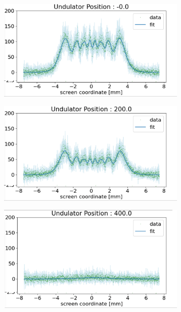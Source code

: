 \documentclass[a4paper,11pt,uplatex]{jsbook}
\begin{document}
\begin{figure}[H]
  \centering
  \begin{subfigure}[h]{0.45\linewidth}
    \centering
    \includegraphics[width=\linewidth]{image/4-double_0.png}
  \end{subfigure}
  \hfill
  \begin{subfigure}[h]{0.45\linewidth}
    \centering
    \includegraphics[width=\linewidth]{image/4-double_200.png}
  \end{subfigure}
  \begin{subfigure}[h]{0.45\linewidth}
    \centering
    \includegraphics[width=\linewidth]{image/4-double_400.png}

\end{subfigure}
\end{figure}
\end{document}
